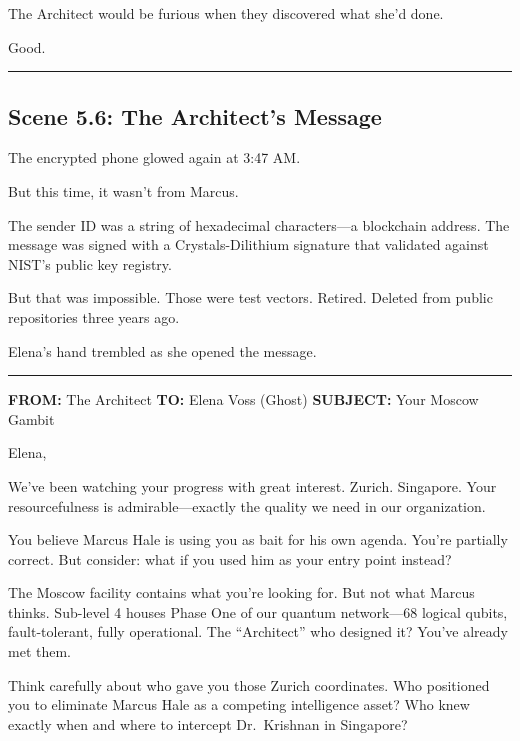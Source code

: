 The Architect would be furious when they discovered what she'd done.

Good.

\begin{center}\rule{0.5\linewidth}{0.5pt}\end{center}

\hypertarget{scene-5.6-the-architects-message}{%
\subsection{Scene 5.6: The Architect's Message}\label{scene-5.6-the-architects-message}}

The encrypted phone glowed again at 3:47 AM.

But this time, it wasn't from Marcus.

The sender ID was a string of hexadecimal characters---a blockchain address. The message was signed with a Crystals-Dilithium signature that validated against NIST's public key registry.

But that was impossible. Those were test vectors. Retired. Deleted from public repositories three years ago.

Elena's hand trembled as she opened the message.

\begin{center}\rule{0.5\linewidth}{0.5pt}\end{center}

\textbf{FROM:} The Architect \textbf{TO:} Elena Voss (Ghost) \textbf{SUBJECT:} Your Moscow Gambit

Elena,

We've been watching your progress with great interest. Zurich. Singapore. Your resourcefulness is admirable---exactly the quality we need in our organization.

You believe Marcus Hale is using you as bait for his own agenda. You're partially correct. But consider: what if you used him as your entry point instead?

The Moscow facility contains what you're looking for. But not what Marcus thinks. Sub-level 4 houses Phase One of our quantum network---68 logical qubits, fault-tolerant, fully operational. The ``Architect'' who designed it? You've already met them.

Think carefully about who gave you those Zurich coordinates. Who positioned you to eliminate Marcus Hale as a competing intelligence asset? Who knew exactly when and where to intercept Dr.~Krishnan in Singapore?

